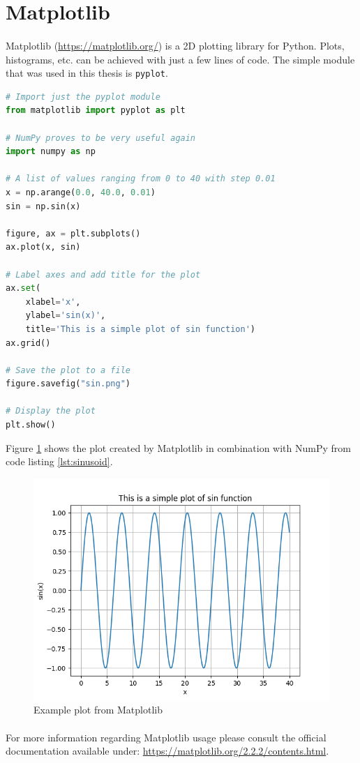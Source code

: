 \section{Matplotlib}
\paragraph{}
Matplotlib (\url{https://matplotlib.org/}) is a 2D plotting library for Python. Plots, histograms, etc. can be achieved with just a few lines of code. The simple module that was used in this thesis is \texttt{pyplot}.

\begin{lstlisting}[language=Python, caption=Example usage of Matplotlib, label={lst:sinusoid}]
# Import just the pyplot module
from matplotlib import pyplot as plt

# NumPy proves to be very useful again
import numpy as np

# A list of values ranging from 0 to 40 with step 0.01
x = np.arange(0.0, 40.0, 0.01)
sin = np.sin(x)

figure, ax = plt.subplots()
ax.plot(x, sin)

# Label axes and add title for the plot
ax.set(
    xlabel='x',
    ylabel='sin(x)',
    title='This is a simple plot of sin function')
ax.grid()

# Save the plot to a file
figure.savefig("sin.png")

# Display the plot
plt.show()
\end{lstlisting}

Figure \ref{fig:matplotlib} shows the plot created by Matplotlib in combination with NumPy from code listing \ref{lst:sinusoid}.

\begin{figure}[H]
	\centering
	\includegraphics[width=\textwidth]{images/sin}
	\caption{Example plot from Matplotlib}
	\label{fig:matplotlib}
\end{figure}

\paragraph{}
For more information regarding Matplotlib usage please consult the official documentation available under: \url{https://matplotlib.org/2.2.2/contents.html}.